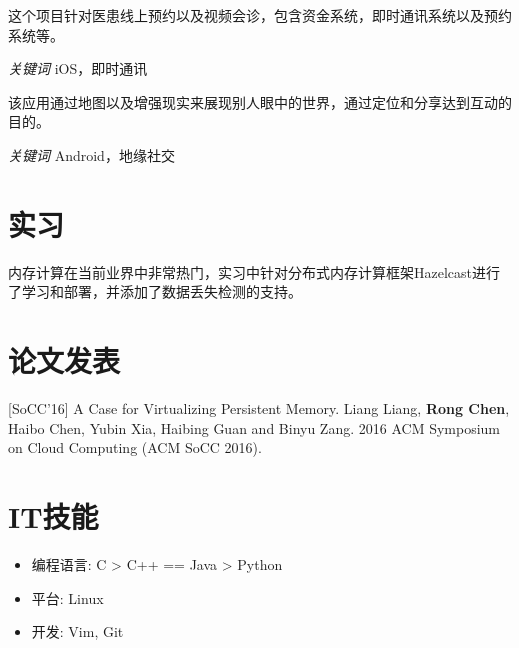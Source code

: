 \documentclass{resume}
\begin{document}
这个项目针对医患线上预约以及视频会诊，包含资金系统，即时通讯系统以及预约系统等。

\textit{关键词} iOS，即时通讯

该应用通过地图以及增强现实来展现别人眼中的世界，通过定位和分享达到互动的目的。

\textit{关键词} Android，地缘社交



\section{实习}
内存计算在当前业界中非常热门，实习中针对分布式内存计算框架Hazelcast进行了学习和部署，并添加了数据丢失检测的支持。

\section{论文发表}
[SoCC'16] A Case for Virtualizing Persistent Memory. Liang Liang, \textbf{Rong Chen}, Haibo Chen, Yubin Xia, Haibing Guan and Binyu Zang. 2016 ACM Symposium on Cloud Computing (ACM SoCC 2016).

\section{IT技能}
\begin{itemize}[parsep=0.5ex]
  \item 编程语言: C > C++ == Java > Python
  \item 平台: Linux
  \item 开发: Vim, Git
\end{itemize}

%
%
\end{document}
